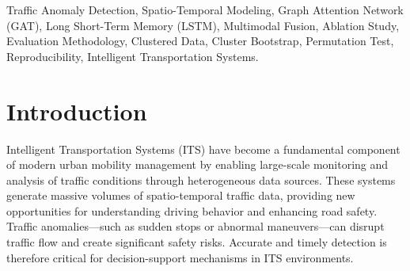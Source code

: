 \documentclass[journal]{IEEEtran}
\begin{document}
\begin{abstract}
does, between epochs $4$ and $19$; the run that never crosses stays weighted towards a spatial branch that carries almost no standalone signal and never leaves $\mathrm{F1} \approx 0.08$. \textbf{Fifth}, the spatial branch cannot be shown to contribute: removing message passing entirely, shuffling the node features, and replacing the topology with random edges each leave performance unchanged within the noise, and under cross-validation the branch shows no significant benefit on any anomaly subtype. \textbf{The one performance difference this study can resolve runs against the proposed architecture.} Gradient boosting on 38 window aggregates reaches $0.9195 \pm 0.0307$ F1 against $0.8589 \pm 0.1458$ for the gated hybrid, a trip-level difference of $+0.0409$ ($95\%$ CI $[+0.0278, +0.0552]$, Holm $p = 0.0002$), and a zero-parameter three-threshold classifier derived from the generation rules reaches $0.8938 \pm 0.0375$---a higher mean than every neural configuration in the fusion comparison, though not than the gradient-boosting models. Replication across four independently generated datasets spanning two road networks leaves $0$ of $40$ pairwise comparisons significant. The study argues that architectural claims in this problem setting require multi-partition, multi-seed evidence at the correct statistical unit, and demonstrates on its own earlier results what happens when they do not have it.
\end{abstract}

\begin{IEEEkeywords}
  Traffic Anomaly Detection, Spatio-Temporal Modeling, Graph Attention Network (GAT), Long Short-Term Memory (LSTM), Multimodal Fusion, Ablation Study, Evaluation Methodology, Clustered Data, Cluster Bootstrap, Permutation Test, Reproducibility, Intelligent Transportation Systems.
\end{IEEEkeywords}

\section{Introduction}

Intelligent Transportation Systems (ITS) have become a fundamental component of modern urban mobility management by enabling large-scale monitoring and analysis of traffic conditions through heterogeneous data sources. These systems generate massive volumes of spatio-temporal traffic data, providing new opportunities for understanding driving behavior and enhancing road safety. Traffic anomalies---such as sudden stops or abnormal maneuvers---can disrupt traffic flow and create significant safety risks. Accurate and timely detection is therefore critical for decision-support mechanisms in ITS environments.
\end{document}
